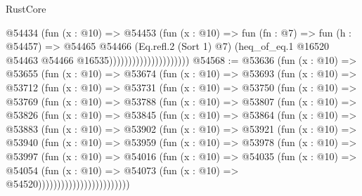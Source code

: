 \begin{lexlean}{RustCore}
\begin{coremodule}
                                      @54434
                                        (fun (x : @10) =>
                                        @54453
                                          (fun (x : @10) =>
                                          fun (fn : @7) =>
                                          fun (h : @54457) =>
                                          @54465
                                            @54466
                                            (Eq.refl.{2} (Sort 1) @7)
                                            (heq_of_eq.{1}
                                              @16520
                                              @54463
                                              @54466
                                              @16535)))))))))))))))))))))
@54568 := @53636
    (fun (x : @10) =>
    @53655
      (fun (x : @10) =>
      @53674
        (fun (x : @10) =>
        @53693
          (fun (x : @10) =>
          @53712
            (fun (x : @10) =>
            @53731
              (fun (x : @10) =>
              @53750
                (fun (x : @10) =>
                @53769
                  (fun (x : @10) =>
                  @53788
                    (fun (x : @10) =>
                    @53807
                      (fun (x : @10) =>
                      @53826
                        (fun (x : @10) =>
                        @53845
                          (fun (x : @10) =>
                          @53864
                            (fun (x : @10) =>
                            @53883
                              (fun (x : @10) =>
                              @53902
                                (fun (x : @10) =>
                                @53921
                                  (fun (x : @10) =>
                                  @53940
                                    (fun (x : @10) =>
                                    @53959
                                      (fun (x : @10) =>
                                      @53978
                                        (fun (x : @10) =>
                                        @53997
                                          (fun (x : @10) =>
                                          @54016
                                            (fun (x : @10) =>
                                            @54035
                                              (fun (x : @10) =>
                                              @54054
                                                (fun (x : @10) =>
                                                @54073
                                                  (fun (x : @10) => @54520))))))))))))))))))))))))

\end{coremodule}
\end{lexlean}
